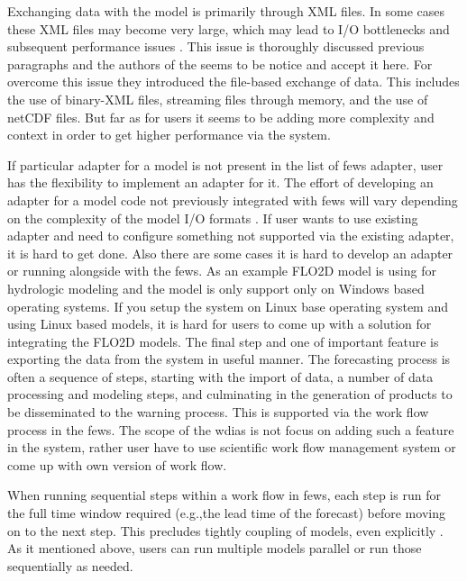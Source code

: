 Exchanging data with the model is primarily through XML files. In some cases these XML files may become very large, which may lead to I/O bottlenecks and subsequent performance issues \cite{Werner2013TheSystem}. This issue is thoroughly discussed previous paragraphs and the authors of the \cite{Werner2013TheSystem} seems to be notice and accept it here. For overcome this issue they introduced the file-based exchange of data. This includes the use of binary-XML files, streaming files through memory, and the use of \acrshort{netCDF} files. But far as for users it seems to be adding more complexity and context in order to get higher performance via the system.

If particular adapter for a model is not present in the list of \acrshort{fews} adapter, user has the flexibility to implement an adapter for it. The effort of developing an adapter for a model code not previously integrated with \acrshort{fews} will vary depending on the complexity of the model I/O formats \cite{Werner2013TheSystem}. If user wants to use existing adapter and need to configure something not supported via the existing adapter, it is hard to get done. Also there are some cases it is hard to develop an adapter or running alongside with the \acrshort{fews}. As an example FLO2D model is using for hydrologic modeling and the model is only support only on Windows based operating systems. If you setup the system on Linux base operating system and using Linux based models, it is hard for users to come up with a solution for integrating the FLO2D models.
The final step and one of important feature is exporting the data from the system in useful manner. %
The forecasting process is often a sequence of steps, starting with the import of data, a number of data processing and modeling steps, and culminating in the generation of products to be disseminated to the warning process. This is supported via the work flow process in the \acrshort{fews}. The scope of the \acrshort{wdias} is not focus on adding such a feature in the system, rather user have to use scientific work flow management system or come up with own version of work flow.

When running sequential steps within a work flow in \acrshort{fews}, each step is run for the full time window required (e.g.,the lead time of the forecast) before moving on to the next step. This precludes tightly coupling of models, even explicitly \cite{Werner2013TheSystem}. As it mentioned above, users can run multiple models parallel or run those sequentially as needed. 
